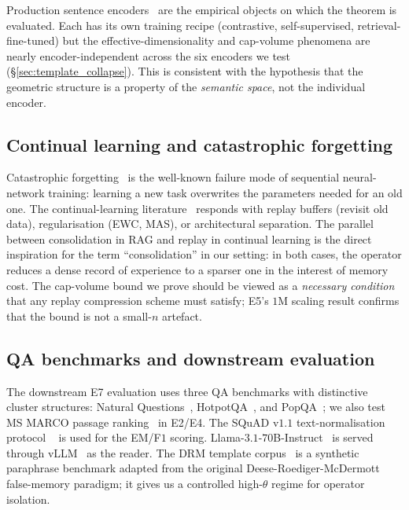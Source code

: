 Production sentence encoders~\cite{reimers2019sbert, gao2021simcse,
wang2022e5, wang2020minilm, song2020mpnet, xiao2023bge, nussbaum2024nomic}
are the empirical objects on which the theorem is evaluated. Each
has its own training recipe (contrastive, self-supervised,
retrieval-fine-tuned) but the effective-dimensionality and
cap-volume phenomena are nearly encoder-independent across the
six encoders we test (\S\ref{sec:template_collapse}). This is consistent with
the hypothesis that the geometric structure is a property of the
\emph{semantic space}, not the individual encoder.

\subsection{Continual learning and catastrophic forgetting}
\label{sec:related:cl}

Catastrophic forgetting~\cite{mccloskey1989cf} is the well-known
failure mode of sequential neural-network training: learning a new
task overwrites the parameters needed for an old one. The
continual-learning literature~\cite{kirkpatrickEWC2017,
chaudhryGEM2019, robinsReplay1995} responds with replay buffers
(revisit old data), regularisation (EWC, MAS), or architectural
separation. The parallel between consolidation in RAG and replay in
continual learning is the direct inspiration for the term
``consolidation'' in our setting: in both cases, the operator reduces
a dense record of experience to a sparser one in the interest of
memory cost. The cap-volume bound we prove should be viewed as a
\emph{necessary condition} that any replay compression scheme must
satisfy; E5's $1$M scaling result confirms that the bound is not a
small-$n$ artefact.

\subsection{QA benchmarks and downstream evaluation}
\label{sec:related:qa}

The downstream E7 evaluation uses three QA benchmarks with
distinctive cluster structures: Natural Questions~\cite{kwiatkowski2019nq},
HotpotQA~\cite{yang2018hotpotqa}, and PopQA~\cite{mallen2023popqa};
we also test MS MARCO passage ranking~\cite{nguyen2016msmarco} in
E2/E4. The SQuAD v$1.1$ text-normalisation protocol
~\cite{rajpurkar2016squad} is used for the EM/F$1$ scoring.
Llama-$3.1$-$70$B-Instruct~\cite{llama31} is served through
vLLM~\cite{kwon2023vllm} as the reader. The DRM template
corpus~\cite{roediger1995drm} is a synthetic paraphrase benchmark
adapted from the original Deese-Roediger-McDermott false-memory
paradigm; it gives us a controlled high-$\theta$ regime for
operator isolation.

